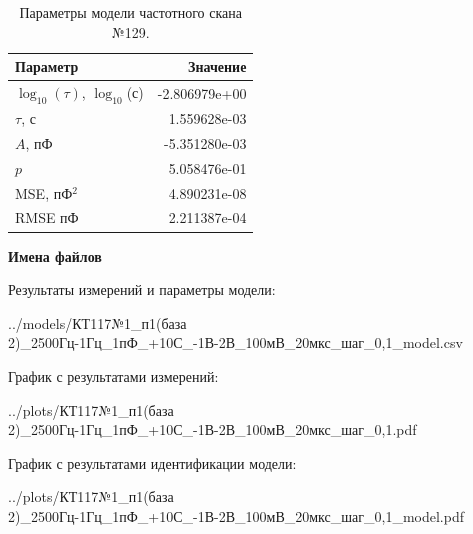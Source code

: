 \begin{table}[!ht]
    \centering
    \caption{Параметры модели частотного скана №129.}
    \begin{tabular}{|l|r|}
        \hline
        Параметр                                       & Значение                  \\ \hline
        $\log_{10}(\tau)$, $\log_{10}$(с)              & -2.806979e+00             \\ \hline
        $\tau$, с                                      & 1.559628e-03              \\ \hline
        $A$, пФ                                        & -5.351280e-03             \\ \hline
        $p$                                            & 5.058476e-01              \\ \hline
        MSE, пФ$^2$                                    & 4.890231e-08              \\ \hline
        RMSE пФ                                        & 2.211387e-04              \\ \hline
    \end{tabular}
    \label{table:frequency_scan_model_129}
\end{table}

\textbf{Имена файлов}

Результаты измерений и параметры модели:

\scriptsize../models/КТ117№1\_п1(база 2)\_2500Гц-1Гц\_1пФ\_+10С\_-1В-2В\_100мВ\_20мкс\_шаг\_0,1\_model.csv
\normalsize

График с результатами измерений:

\scriptsize../plots/КТ117№1\_п1(база 2)\_2500Гц-1Гц\_1пФ\_+10С\_-1В-2В\_100мВ\_20мкс\_шаг\_0,1.pdf
\normalsize

График с результатами идентификации модели:

\scriptsize../plots/КТ117№1\_п1(база 2)\_2500Гц-1Гц\_1пФ\_+10С\_-1В-2В\_100мВ\_20мкс\_шаг\_0,1\_model.pdf
\normalsize

